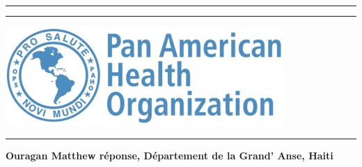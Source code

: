 \documentclass[]{tufte-handout}
\begin{document}
\begin{titlepage}

\hspace*{-1cm}\begin{minipage}[t][0.1\textheight]{5cm}
\textcolor{whoblue!15}{\rule{5cm}{0.1\textheight}}
\end{minipage}
\hspace*{1cm}\begin{minipage}[t]{11.3cm}
\textcolor{whoblue}{\rule{11.3cm}{0.5mm}}
\end{minipage}

\hspace*{-1cm}\begin{minipage}[t][0.1\textheight]{5cm}
\vspace{0pt}
\includegraphics[height=0.1\textheight]{figure/logo_paho.png}\\[0.55cm]
\textcolor{whoblue!15}{\rule{5cm}{0.1\textheight}}
\end{minipage}
\hspace*{1cm}\begin{minipage}[t][0.2\textheight]{11.3cm}{}
\vspace{0pt}
\begin{flushright}
\begin{spacing}{2.0}
{\huge \textbf{Ouragan Matthew réponse, Département de la Grand’ Anse, Haiti}}
\end{spacing}
\end{flushright}
\end{minipage}


\end{titlepage}
\end{document}

